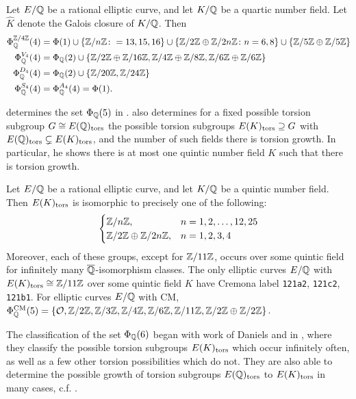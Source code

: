 \begin{thm}
Let $E/\mathbb{Q}$ be a rational elliptic curve, and let $K/\mathbb{Q}$ be a quartic number field. Let $\widehat{K}$ denote the Galois closure of $K/\mathbb{Q}$. Then
	\[
	\begin{aligned}
	\Phi_{\mathbb{Q}}^{\mathbb{Z}/4\mathbb{Z}}(4)&= \Phi(1) \cup \{ \mathbb{Z}/n\mathbb{Z} \colon = 13, 15, 16 \} \cup \{ \mathbb{Z}/2\mathbb{Z} \oplus \mathbb{Z}/2n\mathbb{Z} \colon n= 6, 8 \} \cup \{ \mathbb{Z}/5\mathbb{Z} \oplus \mathbb{Z}/5\mathbb{Z} \} \\
	\Phi_{\mathbb{Q}}^{V_4}(4)&= \Phi_{\mathbb{Q}}(2) \cup \{ \mathbb{Z}/2\mathbb{Z} \oplus \mathbb{Z}/16\mathbb{Z}, \mathbb{Z}/4\mathbb{Z} \oplus \mathbb{Z}/8\mathbb{Z}, \mathbb{Z}/6\mathbb{Z} \oplus \mathbb{Z}/6\mathbb{Z} \} \\
	\Phi_{\mathbb{Q}}^{D_4}(4)&= \Phi_{\mathbb{Q}}(2) \cup \{ \mathbb{Z}/20\mathbb{Z}, \mathbb{Z}/24\mathbb{Z} \} \\
	\Phi_{\mathbb{Q}}^{S_4}(4)&= \Phi_{\mathbb{Q}}^{A_4}(4)= \Phi(1). \\
	\end{aligned}
	\]
\end{thm}


\gonjim{} determines the set $\Phi_{\mathbb{Q}}(5)$ in \cite{gonzalezjimenez17}. \gonjim{} also determines for a fixed possible torsion subgroup $G \cong E(\mathbb{Q})_{\text{tors}}$ the possible torsion subgroups $E(K)_{\text{tors}} \supseteq G$ with $E(\mathbb{Q})_{\text{tors}} \subsetneq E(K)_{\text{tors}}$, and the number of such fields there is torsion growth. In particular, he shows there is at most one quintic number field $K$ such that there is torsion growth. 


\begin{thm}
Let $E/\mathbb{Q}$ be a rational elliptic curve, and let $K/\mathbb{Q}$ be a quintic number field. Then $E(K)_{\text{tors}}$ is isomorphic to precisely one of the following:
	\[
	\begin{cases}
	\mathbb{Z}/n\mathbb{Z}, & n= 1, 2, \ldots, 12, 25 \\
	\mathbb{Z}/2\mathbb{Z} \oplus \mathbb{Z}/2n\mathbb{Z}, & n= 1, 2, 3, 4
	\end{cases}
	\]
Moreover, each of these groups, except for $\mathbb{Z}/11\mathbb{Z}$, occurs over some quintic field for infinitely many $\overline{\mathbb{Q}}$-isomorphism classes. The only elliptic curves $E/\mathbb{Q}$ with $E(K)_{\text{tors}} \cong \mathbb{Z}/11\mathbb{Z}$ over some quintic field $K$ have Cremona label \texttt{121a2}, \texttt{121c2}, \texttt{121b1}. For elliptic curves $E/\mathbb{Q}$ with CM, $\Phi_{\mathbb{Q}}^{\operatorname{CM}}(5)= \{ \mathcal{O}, \mathbb{Z}/2\mathbb{Z}, \mathbb{Z}/3\mathbb{Z}, \mathbb{Z}/4\mathbb{Z}, \mathbb{Z}/6\mathbb{Z}, \mathbb{Z}/11\mathbb{Z}, \mathbb{Z}/2\mathbb{Z} \oplus \mathbb{Z}/2\mathbb{Z} \}$. 
\end{thm}


The classification of the set $\Phi_{\mathbb{Q}}(6)$ began with work of Daniels and \gonjim{} in \cite{danielsgonzalezjimenez20}, where they classify the possible torsion subgroups $E(K)_{\text{tors}}$ which occur infinitely often, as well as a few other torsion possibilities which do not. They are also able to determine the possible growth of torsion subgroups $E(\mathbb{Q})_{\text{tors}}$ to $E(K)_{\text{tors}}$ in many cases, c.f. \cite[Thm.~2]{danielsgonzalezjimenez20}. 


